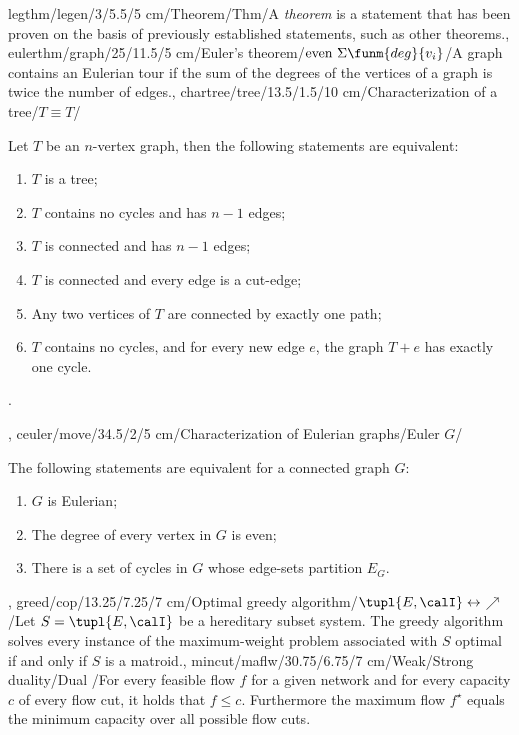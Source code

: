 legthm/legen/3/5.5/5 cm/Theorem/Thm/{A \emph{theorem} is a statement that has been proven on the basis of previously established statements, such as other theorems.},
eulerthm/graph/25/11.5/5 cm/{Euler's theorem}/$\mbox{even}\ \Sigma{\funm{deg}{v_i}}$/{A graph contains an Eulerian tour if the sum of the degrees of the vertices of a graph is twice the number of edges.},
chartree/tree/13.5/1.5/10 cm/{Characterization of a tree}/{$T\equiv T$}/{Let $T$ be an $n$-vertex graph, then the following statements are equivalent:\begin{enumerate}\item $T$ is a tree; \item $T$ contains no cycles and has $n-1$ edges; \item $T$ is connected and has $n-1$ edges; \item $T$ is connected and every edge is a cut-edge; \item Any two vertices of $T$ are connected by exactly one path; \item $T$ contains no cycles, and for every new edge $e$, the graph $T+e$ has exactly one cycle.\end{enumerate}.},
ceuler/move/34.5/2/5 cm/{Characterization of Eulerian graphs}/{Euler $G$}/{The following statements are equivalent for a connected graph $G$:\begin{enumerate}\item $G$ is Eulerian; \item The degree of every vertex in $G$ is even; \item There is a set of cycles in $G$ whose edge-sets partition $E_G$.\end{enumerate}},
greed/cop/13.25/7.25/7 cm/{Optimal greedy algorithm}/{$\tupl{E,\calI}\leftrightarrow$\textdollaroldstyle$\nearrow$}/{Let $S=\tupl{E,\calI}$ be a hereditary subset system. The greedy algorithm solves every instance of the maximum-weight problem associated with $S$ optimal if and only if $S$ is a matroid.},
mincut/maflw/30.75/6.75/7 cm/{Weak/Strong duality}/{Dual \watertap}/{For every feasible flow $f$ for a given network and for every capacity $c$ of every flow cut, it holds that $f\leq c$. Furthermore the maximum flow $f^{\star}$ equals the minimum capacity over all possible flow cuts.}